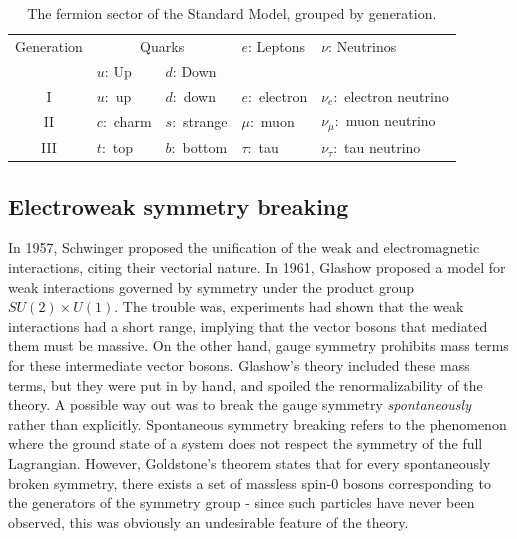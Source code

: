 \begin{table}
  \raggedright
\strictpagecheck
\begin{adjustwidth}{-0.5in}{0in}
  \begin{tabular}{cllll}
    \toprule
    Generation & \multicolumn{2}{c}{Quarks} & $e$: Leptons & $\nu$: Neutrinos \\ \cmidrule(r){2-3}
     & $u$: Up & $d$: Down &                                       & \\\midrule
    I           & $u:$ up                    & $d:$ down     & $e:$ electron                         & $\nu_e:$ electron neutrino\\
    II          & $c:$ charm                 & $s:$ strange  & $\mu:$ muon                           & $\nu_\mu:$ muon neutrino\\
    III         & $t:$ top                   & $b:$ bottom   & $\tau:$ tau                           & $\nu_\tau:$ tau neutrino\\
    \bottomrule
  \end{tabular}
  \caption{The fermion sector of the Standard Model, grouped by generation.}
  \label{tab:fermion_generations}
\end{adjustwidth}
\end{table}
\subsection{Electroweak symmetry breaking}\label{subsec:ewsb}
In 1957, Schwinger proposed the unification of the weak and electromagnetic interactions, citing their vectorial nature. In 1961, Glashow proposed a model for weak interactions governed by symmetry under the product group $SU(2)\times U(1)$. The trouble was, experiments had shown that the weak interactions had a short range, implying that the vector bosons that mediated them must be massive. On the other hand, gauge symmetry prohibits mass terms for these intermediate vector bosons. Glashow's theory included these mass terms, but they were put in by hand, and spoiled the renormalizability of the theory. A possible way out was to break the gauge symmetry \emph{spontaneously} rather than explicitly. Spontaneous symmetry breaking refers to the phenomenon where the ground state of a system does not respect the symmetry of the full Lagrangian. However, Goldstone's theorem states that for every spontaneously broken symmetry, there exists a set of massless spin-0 bosons corresponding to the generators of the symmetry group - since such particles have never been observed, this was obviously an undesirable feature of the theory. 

